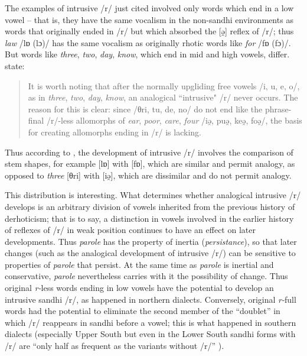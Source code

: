 \documentclass[output=paper,
modfonts
]{LSP/langsci}
\begin{document}
The examples of intrusive /r/ just cited involved only words which end
in a low vowel -- that is, they have the same vocalism in the non-sandhi
environments as words that originally ended in /r/ but which absorbed
the {[}ə̯{]} reflex of /r/; thus \emph{law} /lɒ (lɔ)/ has the same
vocalism as originally rhotic words like \emph{for} /fɒ (fɔ)/. But words
like \emph{three}, \emph{two}, \emph{day}, \emph{know}, which end in mid
and high vowels, differ. \citet[172b]{KUR} state:

\begin{quote}
It is worth noting that after the normally upgliding free vowels /i, u,
e, o/, as in \emph{three}, \emph{two}, \emph{day}, \emph{know}, an
analogical ``intrusive" /r/ never occurs. The reason for this is clear:
since /θri, tu, de, no/ do not end like the phrase-final /r/-less
allomorphs of \emph{ear}, \emph{poor}, \emph{care}, \emph{four} /iə̯,
puə̯, keə̯, foə̯/, the basis for creating allomorphs ending in /r/ is
lacking.
\end{quote}

Thus according to \citet{KUR}, the development of intrusive /r/
involves the comparison of stem shapes, for example {[}lɒ{]} with
{[}fɒ{]}, which are similar and permit analogy, as opposed to
\emph{three} {[}θri{]} with {[}iə̯{]}, which are dissimilar and do not
permit analogy.

This distribution is interesting. What determines whether analogical
intrusive /r/ develops is an arbitrary division of vowels inherited from
the previous history of derhoticism; that is to say, a distinction in
vowels involved in the earlier history of reflexes of /r/ in weak
position continues to have an effect on later developments. Thus
\emph{parole} has the property of inertia (\emph{persistance}), so that
later changes (such as the analogical development of intrusive /r/) can
be sensitive to properties of \emph{parole} that persist. At the same
time as \emph{parole} is inertial and conservative, \emph{parole}
nevertheless carries with it the possibility of change. Thus original
\emph{r-}less words ending in low vowels have the potential to develop
an intrusive sandhi /r/, as happened in northern dialects. Conversely,
original \emph{r-}full words had the potential to eliminate the second
member of the ``doublet'' in which /r/ reappears in sandhi before a
vowel; this is what happened in southern dialects (especially Upper
South but even in the Lower South sandhi forms with /r/ are ``only half
as frequent as the variants without /r/'' \citep[171b]{KUR}).
\end{document}
